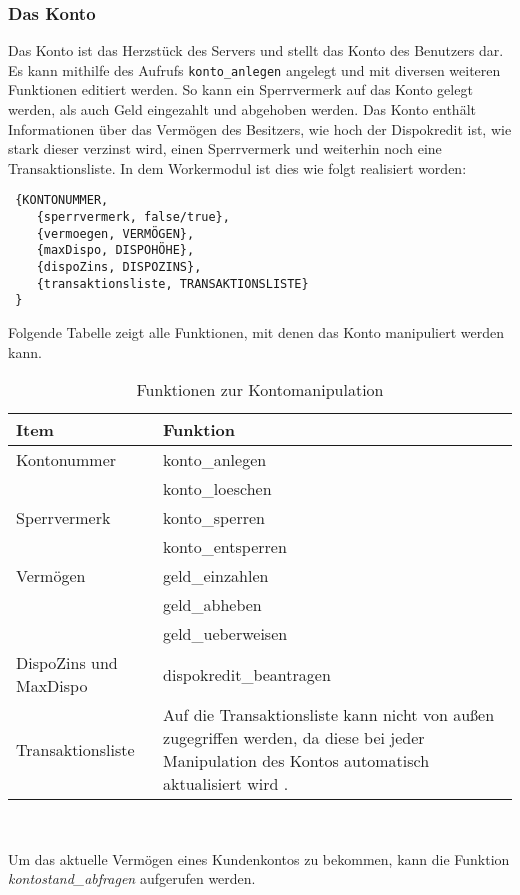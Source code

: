 \subsubsection{Das Konto}
Das Konto ist das Herzstück des Servers und stellt das Konto des Benutzers dar. Es kann mithilfe des Aufrufs \texttt{konto\_anlegen} angelegt und mit diversen weiteren Funktionen editiert werden. So kann ein Sperrvermerk auf das Konto gelegt werden, als auch Geld eingezahlt und abgehoben werden. Das Konto enthält Informationen über das Vermögen des Besitzers, wie hoch der Dispokredit ist, wie stark dieser verzinst wird, einen Sperrvermerk und weiterhin noch eine Transaktionsliste. In dem Workermodul ist dies wie folgt realisiert worden:
\begin{lstlisting}
 {KONTONUMMER, 
	{sperrvermerk, false/true},
 	{vermoegen, VERMÖGEN},
	{maxDispo, DISPOHÖHE},
	{dispoZins, DISPOZINS},
	{transaktionsliste, TRANSAKTIONSLISTE}
 }
\end{lstlisting}
Folgende Tabelle zeigt alle Funktionen, mit denen das Konto manipuliert werden kann.\\
\begin{table}[H]
\caption{Funktionen zur Kontomanipulation}
\begin{center}
\begin{tabular}{p{5 cm}|p{9 cm}}
Item & Funktion \\
				\hline\hline
Kontonummer & konto\_anlegen \\
& konto\_loeschen \\
				\hline
Sperrvermerk & konto\_sperren \\
& konto\_entsperren \\
				\hline
Vermögen & geld\_einzahlen \\
& geld\_abheben \\
& geld\_ueberweisen\\
				\hline
DispoZins und MaxDispo & dispokredit\_beantragen \\
				\hline
Transaktionsliste & Auf die Transaktionsliste kann nicht von außen zugegriffen werden, da diese bei jeder Manipulation des Kontos automatisch aktualisiert wird .
\end{tabular}\\
\end{center}
\end{table}
Um das aktuelle Vermögen eines Kundenkontos zu bekommen, kann die Funktion \textit{kontostand\_abfragen} aufgerufen werden. 
